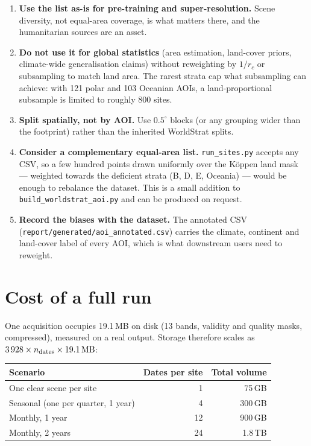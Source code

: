 \documentclass[11pt,a4paper]{article}
\begin{document}
\begin{enumerate}
  \item \textbf{Use the list as-is for pre-training and super-resolution.} Scene diversity, not
        equal-area coverage, is what matters there, and the humanitarian sources are an asset.
  \item \textbf{Do not use it for global statistics} (area estimation, land-cover priors,
        climate-wide generalisation claims) without reweighting by $1/r_c$ or subsampling to
        match land area. The rarest strata cap what subsampling can achieve: with 121 polar and
        103 Oceanian AOIs, a land-proportional subsample is limited to roughly 800 sites.
  \item \textbf{Split spatially, not by AOI.} Use $0.5^\circ$ blocks (or any grouping wider than
        the footprint) rather than the inherited WorldStrat splits.
  \item \textbf{Consider a complementary equal-area list.} \texttt{run\_sites.py} accepts any
        CSV, so a few hundred points drawn uniformly over the Köppen land mask --- weighted
        towards the deficient strata (B, D, E, Oceania) --- would be enough to rebalance the
        dataset. This is a small addition to \texttt{build\_worldstrat\_aoi.py} and can be
        produced on request.
  \item \textbf{Record the biases with the dataset.} The annotated CSV
        (\texttt{report/generated/aoi\_annotated.csv}) carries the climate, continent and
        land-cover label of every AOI, which is what downstream users need to reweight.
\end{enumerate}

\section{Cost of a full run}

One acquisition occupies 19.1\,MB on disk (13 bands, validity and quality masks, compressed),
measured on a real output. Storage therefore scales as
$3\,928 \times n_\text{dates} \times 19.1\,\mathrm{MB}$:

\begin{center}
\begin{tabular}{lrr}
\toprule
Scenario & Dates per site & Total volume \\
\midrule
One clear scene per site           & 1  & 75\,GB \\
Seasonal (one per quarter, 1 year) & 4  & 300\,GB \\
Monthly, 1 year                    & 12 & 900\,GB \\
Monthly, 2 years                   & 24 & 1.8\,TB \\
\bottomrule
\end{tabular}
\end{center}
\end{document}
